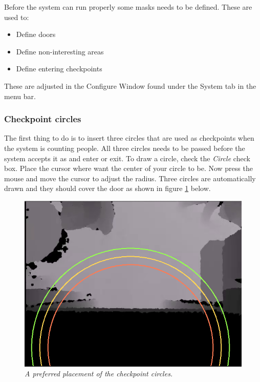 Before the system can run properly some masks needs to be defined. These are used to:

\begin{itemize}
\item Define doors
\item Define non-interesting areas
\item Define entering checkpoints
\end{itemize}

These are adjusted in the Configure Window found under the System tab in the menu bar.

\subsubsection{Checkpoint circles}
The first thing to do is to insert three circles that are used as checkpoints when the system is counting people. All three circles needs to be passed before the system accepts it as and enter or exit. To draw a circle, check the \textit{Circle} check box. Place the cursor where want the center of your circle to be. Now press the mouse and move the cursor to adjust the radius. Three circles are automatically drawn and they should cover the door as shown in figure \ref{fig:circlePlacement} below.

\begin{figure}[H]
	\centering
	\includegraphics[width=\linewidth]{images/Manual2.png}
	\caption[Circle placment]{\textit{A preferred placement of the checkpoint circles. }}
	\label{fig:circlePlacement}  %
\end{figure}

